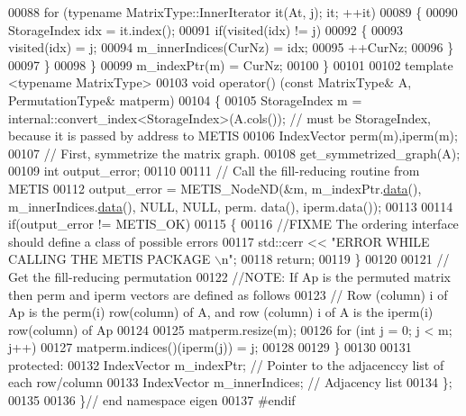 \begin{DoxyCode}
00088       \textcolor{keywordflow}{for} (\textcolor{keyword}{typename} MatrixType::InnerIterator it(At, j); it; ++it)
00089       \{
00090         StorageIndex idx = it.index(); 
00091         \textcolor{keywordflow}{if}(visited(idx) != j)
00092         \{
00093           visited(idx) = j; 
00094           m\_innerIndices(CurNz) = idx; 
00095           ++CurNz; 
00096         \}
00097       \}
00098     \}
00099     m\_indexPtr(m) = CurNz;    
00100   \}
00101   
00102   \textcolor{keyword}{template} <\textcolor{keyword}{typename} MatrixType>
00103   \textcolor{keywordtype}{void} operator() (\textcolor{keyword}{const} MatrixType& A, PermutationType& matperm)
00104   \{
00105      StorageIndex m = internal::convert\_index<StorageIndex>(A.cols()); \textcolor{comment}{// must be StorageIndex, because it
       is passed by address to METIS}
00106      IndexVector perm(m),iperm(m); 
00107     \textcolor{comment}{// First, symmetrize the matrix graph. }
00108      get\_symmetrized\_graph(A); 
00109      \textcolor{keywordtype}{int} output\_error;
00110      
00111      \textcolor{comment}{// Call the fill-reducing routine from METIS }
00112      output\_error = METIS\_NodeND(&m, m\_indexPtr.\hyperlink{class_eigen_1_1_plain_object_base_ac25699535374b1854cf8494e44ad31b2}{data}(), m\_innerIndices.\hyperlink{class_eigen_1_1_plain_object_base_ac25699535374b1854cf8494e44ad31b2}{data}(), NULL, NULL, perm.
      data(), iperm.data());
00113      
00114     \textcolor{keywordflow}{if}(output\_error != METIS\_OK) 
00115     \{
00116       \textcolor{comment}{//FIXME The ordering interface should define a class of possible errors }
00117      std::cerr << \textcolor{stringliteral}{"ERROR WHILE CALLING THE METIS PACKAGE \(\backslash\)n"}; 
00118      \textcolor{keywordflow}{return}; 
00119     \}
00120     
00121     \textcolor{comment}{// Get the fill-reducing permutation }
00122     \textcolor{comment}{//NOTE:  If Ap is the permuted matrix then perm and iperm vectors are defined as follows }
00123     \textcolor{comment}{// Row (column) i of Ap is the perm(i) row(column) of A, and row (column) i of A is the iperm(i)
       row(column) of Ap}
00124     
00125      matperm.resize(m);
00126      \textcolor{keywordflow}{for} (\textcolor{keywordtype}{int} j = 0; j < m; j++)
00127        matperm.indices()(iperm(j)) = j;
00128    
00129   \}
00130   
00131   \textcolor{keyword}{protected}:
00132     IndexVector m\_indexPtr; \textcolor{comment}{// Pointer to the adjacenccy list of each row/column}
00133     IndexVector m\_innerIndices; \textcolor{comment}{// Adjacency list }
00134 \};
00135 
00136 \}\textcolor{comment}{// end namespace eigen }
00137 \textcolor{preprocessor}{#endif}
\end{DoxyCode}
